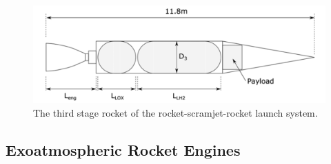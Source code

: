  


\begin{figure}[ht]
\centering
\includegraphics[width=0.7\linewidth]{figures/2_literature-review/ThirdStage}
\caption{The third stage rocket of the rocket-scramjet-rocket launch system\cite{Preller2017b}.}
\label{fig:ThirdStage}
\end{figure}

\subsection{Exoatmospheric Rocket Engines}

